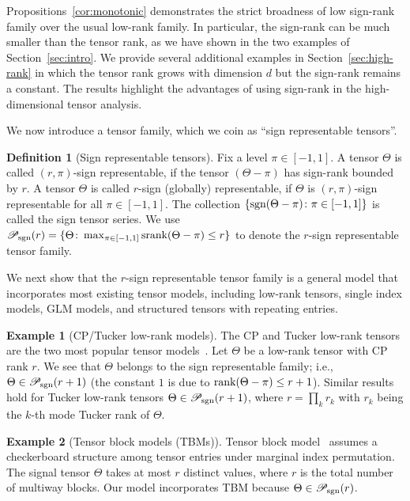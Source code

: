 \documentclass[twoside,11pt]{article}
\theoremstyle{plain}
\theoremstyle{definition}
\newtheorem{defn}{Definition}
\newtheorem{example}{Example}
\def\sign{\textup{sgn}}
\def\srank{\textup{srank}}
\def\rank{\textup{rank}}
\def\caliP{\mathscr{P}_{\textup{sgn}}}
\begin{document}
Propositions~\ref{cor:monotonic} demonstrates the strict broadness of low sign-rank family over the usual low-rank family. 
In particular, the sign-rank can be much smaller than the tensor rank, as we have shown in the two examples of Section~\ref{sec:intro}. We provide several additional examples in Section~\ref{sec:high-rank} in which the tensor rank grows with dimension $d$ but the sign-rank remains a constant. The results highlight the advantages of using sign-rank in the high-dimensional tensor analysis. 

We now introduce a tensor family, which we coin as ``sign representable tensors''.
\begin{defn}[Sign representable tensors] 
Fix a level $\pi\in[-1,1]$. A tensor $\Theta$ is called $(r,\pi)$-sign representable, if the tensor $(\Theta-\pi)$ has sign-rank bounded by $r$. A tensor $\Theta$ is called $r$-sign (globally) representable, if $\Theta$ is $(r,\pi)$-sign representable for all $\pi\in[-1,1]$. The collection $\{\sign(\Theta-\pi)\colon \pi \in[-1,1]\}$ is called the sign tensor series. 
We use $\caliP(r)=\{\Theta\colon \max_{\pi\in[-1,1]}\srank(\Theta-\pi)\leq r\}$ to denote the $r$-sign representable tensor family.
\end{defn}

We next show that the $r$-sign representable tensor family is a general model that incorporates most existing tensor models, including low-rank tensors, single index models, GLM models, and structured tensors with repeating entries. 

\begin{example}[CP/Tucker low-rank models] The CP and Tucker low-rank tensors are the two most popular tensor models~\citep{kolda2009tensor}. Let $\Theta$ be a low-rank tensor with CP rank $r$. We see that $\Theta$ belongs to the sign representable family; i.e., $\Theta\in\caliP(r+1)$ (the constant $1$ is due to $\rank(\Theta-\pi)\leq r+1$). Similar results hold for Tucker low-rank tensors $\Theta\in\caliP(r+1)$, where $r=\prod_kr_k$ with $r_k$ being the $k$-th mode Tucker rank of $\Theta$.  
\end{example} 
\begin{example}[Tensor block models (TBMs)] Tensor block model~\citep{wang2019multiway,chi2020provable} assumes a checkerboard structure among tensor entries under marginal index permutation. The signal tensor $\Theta$ takes at most $r$ distinct values, where $r$ is the total number of multiway blocks. Our model incorporates TBM because $\Theta \in \caliP(r)$. 
\end{example}
\end{document}
